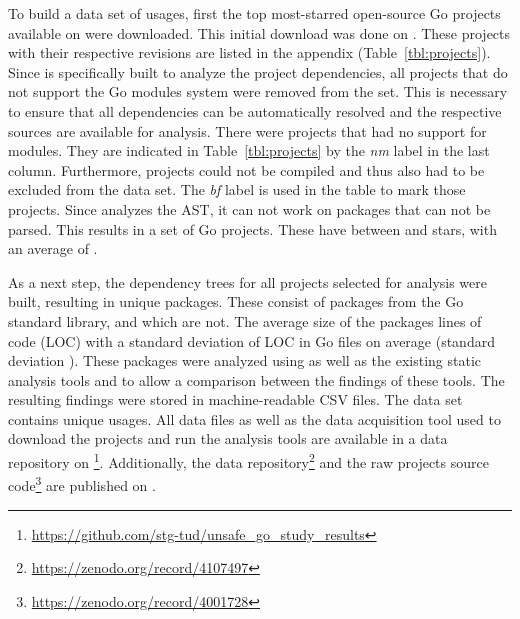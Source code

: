 To build a data set of \unsafe{} usages, first the top \projsTotal{} most-starred open-source Go projects available on
\github{} were downloaded.
This initial download was done on .
These \projsTotal{} projects with their respective revisions are listed in the appendix (Table~\ref{tbl:projects}).
Since \toolGeiger{} is specifically built to analyze the project dependencies, all projects that do not support the Go
modules system were removed from the set.
This is necessary to ensure that all dependencies can be automatically resolved and the respective sources are available
for analysis.
There were \projsWithoutModules{} projects that had no support for modules.
They are indicated in Table~\ref{tbl:projects} by the \textit{nm} label in the last column.
Furthermore, \projsNotCompiled{} projects could not be compiled and thus also had to be excluded from the data set.
The \textit{bf} label is used in the table to mark those projects.
Since \toolGeiger{} analyzes the \acrshort{AST}, it can not work on packages that can not be parsed.
This results in a set of \projsAnalyzed{} Go projects.
These have between  and  stars, with an average of .

As a next step, the dependency trees for all projects selected for analysis were built, resulting in \packagesAnalyzed{}
unique packages.
These consist of  packages from the Go standard library, and  which are not.
The average size of the packages  lines of code (\acrshort{LOC}) with a standard deviation of
 \acrshort{LOC} in  Go files on average (standard deviation ).
These packages were analyzed using \toolGeiger{} as well as the existing static analysis tools \toolVet{} and
\toolGosec{} to allow a comparison between the findings of these tools.
The resulting findings were stored in machine-readable \acrshort{CSV} files.
The data set contains \uniqueUnsafeFindings{} unique \unsafe{} usages.
All data files as well as the data acquisition tool used to download the projects and run the analysis tools are
available in a data repository on \github{}\footnote{\url{https://github.com/stg-tud/unsafe_go_study_results}}.
Additionally, the data repository\footnote{\url{https://zenodo.org/record/4107497}} and the raw projects source
code\footnote{\url{https://zenodo.org/record/4001728}} are published on \zenodo{}.



